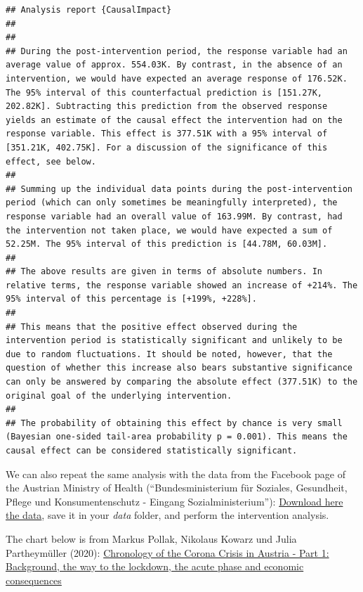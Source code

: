 \documentclass[
]{article}
\begin{document}
\begin{verbatim}
## Analysis report {CausalImpact}
## 
## 
## During the post-intervention period, the response variable had an average value of approx. 554.03K. By contrast, in the absence of an intervention, we would have expected an average response of 176.52K. The 95% interval of this counterfactual prediction is [151.27K, 202.82K]. Subtracting this prediction from the observed response yields an estimate of the causal effect the intervention had on the response variable. This effect is 377.51K with a 95% interval of [351.21K, 402.75K]. For a discussion of the significance of this effect, see below.
## 
## Summing up the individual data points during the post-intervention period (which can only sometimes be meaningfully interpreted), the response variable had an overall value of 163.99M. By contrast, had the intervention not taken place, we would have expected a sum of 52.25M. The 95% interval of this prediction is [44.78M, 60.03M].
## 
## The above results are given in terms of absolute numbers. In relative terms, the response variable showed an increase of +214%. The 95% interval of this percentage is [+199%, +228%].
## 
## This means that the positive effect observed during the intervention period is statistically significant and unlikely to be due to random fluctuations. It should be noted, however, that the question of whether this increase also bears substantive significance can only be answered by comparing the absolute effect (377.51K) to the original goal of the underlying intervention.
## 
## The probability of obtaining this effect by chance is very small (Bayesian one-sided tail-area probability p = 0.001). This means the causal effect can be considered statistically significant.
\end{verbatim}

We can also repeat the same analysis with the data from the Facebook page of the Austrian Ministry of Health (``Bundesministerium für Soziales, Gesundheit, Pflege und Konsumentenschutz - Eingang Sozialministerium''): \href{https://drive.google.com/file/d/1ogZxpKd6jLyhFRn8I1Z-Kt5gQQX7h5cH/view?usp=sharing}{Download here the data}, save it in your \emph{data} folder, and perform the intervention analysis.

The chart below is from Markus Pollak, Nikolaus Kowarz und Julia Partheymüller (2020): \href{https://viecer.univie.ac.at/en/projects-and-cooperations/austrian-corona-panel-project/corona-blog/corona-blog-beitraege/blog51/}{Chronology of the Corona Crisis in Austria - Part 1: Background, the way to the lockdown, the acute phase and economic consequences}
\end{document}
